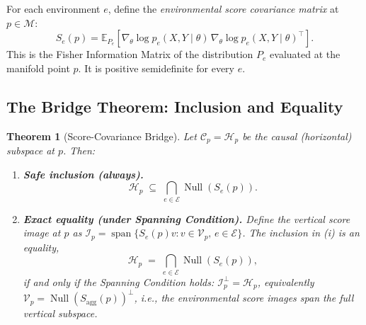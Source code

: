 \documentclass[11pt,a4paper]{article}
\newtheorem{theorem}{Theorem}[section]
\DeclareMathOperator{\Null}{Null}
\DeclareMathOperator{\spa}{span}
\newcommand{\cC}{\mathcal{C}}
\newcommand{\cM}{\mathcal{M}}
\newcommand{\cH}{\mathcal{H}}
\newcommand{\cV}{\mathcal{V}}
\newcommand{\cE}{\mathcal{E}}
\newcommand{\EE}{\mathbb{E}}
\begin{document}
For each environment $e$, define the \emph{environmental score covariance matrix} at $p \in \cM$:
\begin{equation}
S_e(p) = \EE_{P_e}\!\left[\nabla_\theta \log p_e(X, Y \mid \theta)\,\nabla_\theta \log p_e(X, Y \mid \theta)^\top\right].
\label{eq:score_cov}
\end{equation}
This is the Fisher Information Matrix of the distribution $P_e$ evaluated at the manifold point $p$. It is positive semidefinite for every $e$.

\subsection{The Bridge Theorem: Inclusion and Equality}

\begin{theorem}[Score-Covariance Bridge]\label{thm:bridge}
Let $\cC_p = \cH_p$ be the causal (horizontal) subspace at $p$. Then:
\begin{enumerate}[label=(\roman*)]
\item \textbf{Safe inclusion (always).}
\[
\cH_p \;\subseteq\; \bigcap_{e \in \cE} \Null(S_e(p)).
\]
\item \textbf{Exact equality (under Spanning Condition).} Define the \emph{vertical score image} at $p$ as $\mathcal{I}_p = \spa\{S_e(p) v : v \in \cV_p,\, e \in \cE\}$. The inclusion in (i) is an equality,
\[
\cH_p \;=\; \bigcap_{e \in \cE} \Null(S_e(p)),
\]
if and only if the Spanning Condition holds: $\mathcal{I}_p^\perp = \cH_p$, equivalently $\cV_p = \Null(S_{\mathrm{agg}}(p))^\perp$, i.e., the environmental score images span the full vertical subspace.
\end{enumerate}
\end{theorem}
\end{document}
